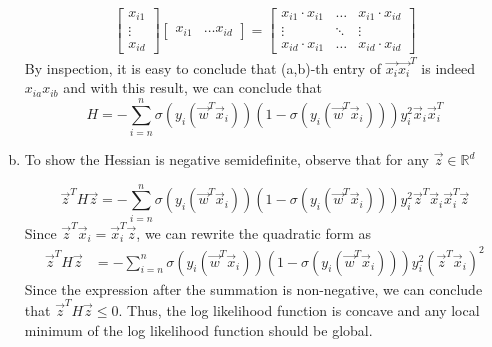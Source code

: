 \documentclass{article}
\begin{document}
\begin{enumerate}[(a)]
	    \begin{align*}
	    	\begin{bmatrix}
	    	        x_{i1} \\
	    	        \vdots \\
	    	        x_{id}
		    \end{bmatrix}
	    	    \begin{bmatrix}
	    	        x_{i1} & \hdots x_{id}
	    	    \end{bmatrix} =  
	    	    \begin{bmatrix}
	    	        x_{i1}\cdot x_{i1} & \hdots & x_{i1}\cdot x_{id} \\
	    	        \vdots & \ddots & \vdots \\
	    	        x_{id}\cdot
	    	        x_{i1} & \hdots & x_{id}\cdot x_{id}
	    	    \end{bmatrix}
	    \end{align*}
	    By inspection, it is easy to conclude that (a,b)-th entry of $\vec{x_i}\vec{x_i}^T$ is indeed $x_{ia}x_{ib}$ and with this result, we can conclude that 
	    $$H = -\sum_{i = n}^{n} \sigma(y_i(\vec{w}^T\vec{x}_i))(1 - \sigma(y_i(\vec{w}^T\vec{x}_i)))y_i^2 \vec{x}_i\vec{x}_i^T$$
   
   \item To show the Hessian is negative semidefinite, observe that for any $ \vec{z} \in \mathbb{R}^d $
   
   $$
   	\vec{z}^TH \vec{z} = -\sum_{i = n}^{n} \sigma(y_i(\vec{w}^T\vec{x}_i))(1 - \sigma(y_i(\vec{w}^T\vec{x}_i)))y_i^2 \vec{z}^T\vec{x}_i\vec{x}_i^T \vec{z}
   $$
   Since $\vec{z}^T\vec{x}_i = \vec{x}_i^T \vec{z}$, we can rewrite the quadratic form as 
   \begin{align*}
   	\vec{z}^TH \vec{z} &= -\sum_{i = n}^{n} \sigma(y_i(\vec{w}^T\vec{x}_i))(1 - \sigma(y_i(\vec{w}^T\vec{x}_i)))y_i^2 (\vec{z}^T\vec{x}_i)^2
   \end{align*}
   Since the expression after the summation is non-negative, we can conclude that $	\vec{z}^TH \vec{z} \leq 0$. Thus, the log likelihood function is concave and any local minimum of the log likelihood function should be global.   
\end{enumerate}
\end{document}
